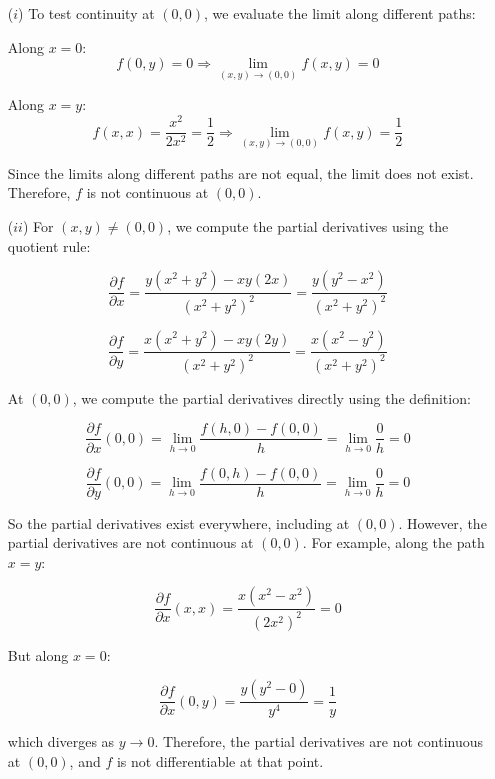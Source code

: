 \documentclass{report}
\begin{document}
\begin{itemize}
  \item[(\(i\))] To test continuity at \((0,0)\), we evaluate the limit along different paths:

  Along \(x = 0\):
  \[
  f(0,y) = 0 \Rightarrow \lim_{(x,y)\to(0,0)} f(x,y) = 0
  \]

  Along \(x = y\):
  \[
  f(x,x) = \frac{x^2}{2x^2} = \frac{1}{2} \Rightarrow \lim_{(x,y)\to(0,0)} f(x,y) = \frac{1}{2}
  \]

  Since the limits along different paths are not equal, the limit does not exist. Therefore, \(f\) is not continuous at \((0,0)\).

  \item[(\(ii\))] For \((x,y) \neq (0,0)\), we compute the partial derivatives using the quotient rule:

  \[
  \frac{\partial f}{\partial x} = \frac{y(x^2 + y^2) - xy(2x)}{(x^2 + y^2)^2} = \frac{y(y^2 - x^2)}{(x^2 + y^2)^2}
  \]

  \[
  \frac{\partial f}{\partial y} = \frac{x(x^2 + y^2) - xy(2y)}{(x^2 + y^2)^2} = \frac{x(x^2 - y^2)}{(x^2 + y^2)^2}
  \]

  At \((0,0)\), we compute the partial derivatives directly using the definition:

  \[
  \frac{\partial f}{\partial x}(0,0) = \lim_{h\to 0} \frac{f(h,0) - f(0,0)}{h} = \lim_{h\to 0} \frac{0}{h} = 0
  \]

  \[
  \frac{\partial f}{\partial y}(0,0) = \lim_{h\to 0} \frac{f(0,h) - f(0,0)}{h} = \lim_{h\to 0} \frac{0}{h} = 0
  \]

  So the partial derivatives exist everywhere, including at \((0,0)\). However, the partial derivatives are not continuous at \((0,0)\). For example, along the path \(x = y\):

  \[
  \frac{\partial f}{\partial x}(x,x) = \frac{x(x^2 - x^2)}{(2x^2)^2} = 0
  \]

  But along \(x = 0\):

  \[
  \frac{\partial f}{\partial x}(0,y) = \frac{y(y^2 - 0)}{y^4} = \frac{1}{y}
  \]

  which diverges as \(y \to 0\). Therefore, the partial derivatives are not continuous at \((0,0)\), and \(f\) is not differentiable at that point.
\end{itemize}
\end{document}
